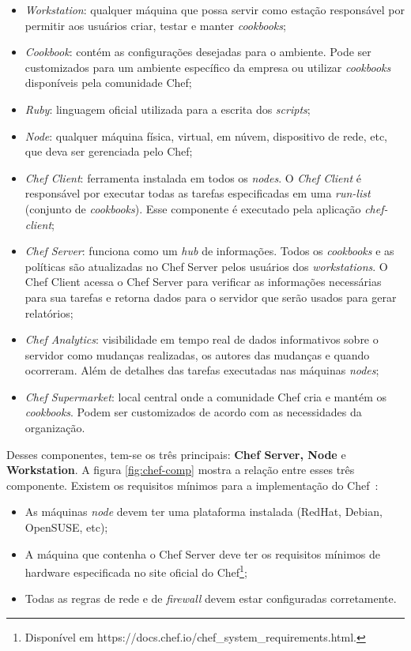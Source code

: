 \begin{itemize}
  \item \textit{Workstation}: qualquer máquina que possa servir como estação
    responsável por permitir aos usuários criar, testar e manter \textit{cookbooks};
  \item \textit{Cookbook}: contém as configurações desejadas para o ambiente.
    Pode ser customizados para um ambiente específico da empresa ou utilizar
    \textit{cookbooks} disponíveis pela comunidade Chef;
  \item \textit{Ruby}: linguagem oficial utilizada para a escrita dos \textit{scripts};
  \item \textit{Node}: qualquer máquina física, virtual, em núvem, dispositivo
    de rede, etc, que deva ser gerenciada pelo Chef;
  \item \textit{Chef Client}: ferramenta instalada em todos os \textit{nodes}. O
    \textit{Chef Client} é responsável por executar todas as tarefas especificadas
    em uma \textit{run-list} (conjunto de \textit{cookbooks}). Esse componente é
    executado pela aplicação \textit{chef-client};
  \item \textit{Chef Server}: funciona como um \textit{hub} de informações. Todos os
    \textit{cookbooks} e as políticas são atualizadas no Chef Server pelos usuários
    dos \textit{workstations}. O Chef Client acessa o Chef Server para verificar
    as informações necessárias para sua tarefas e retorna dados para o servidor
    que serão usados para gerar relatórios;
  \item \textit{Chef Analytics}: visibilidade em tempo real de dados informativos
    sobre o servidor como mudanças realizadas, os autores das mudanças e quando
    ocorreram. Além de detalhes das tarefas executadas nas máquinas \textit{nodes};
  \item \textit{Chef Supermarket}: local central onde a comunidade Chef cria e
    mantém os \textit{cookbooks}. Podem ser customizados de acordo com as necessidades
    da organização.
\end{itemize}

Desses componentes, tem-se os três principais: \textbf{Chef Server, Node} e \textbf{Workstation}.
A figura \ref{fig:chef-comp} mostra a relação entre esses três componente. Existem os requisitos
mínimos para a implementação do Chef~\cite{chefdoc:2016}:

\begin{itemize}
  \item As máquinas \textit{node} devem ter uma plataforma instalada (RedHat,
    Debian, OpenSUSE, etc);
  \item A máquina que contenha o Chef Server deve ter os requisitos
    mínimos de hardware especificada no site oficial do Chef\footnote{Disponível em https://docs.chef.io/chef\_system\_requirements.html.};
  \item Todas as regras de rede e de \textit{firewall} devem estar configuradas
    corretamente.
\end{itemize}

